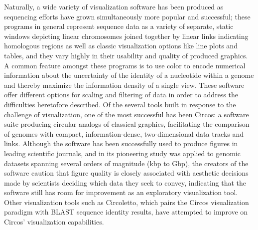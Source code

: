 \documentclass[twocolumn]{article}
\begin{document}
Naturally, a wide variety of visualization software has been produced as sequencing efforts have grown simultaneously more popular and successful; these programs in general represent sequence data as a variety of separate, static windows depicting linear chromosomes joined together by linear links indicating homologous regions as well as classic visualization options like line plots and tables, and they vary highly in their usability and quality of produced graphics. A common feature amongst these programs is to use color to encode numerical information about the uncertainty of the identity of a nucleotide within a genome and thereby maximize the information density of a single view. These software offer different options for scaling and filtering of data in order to address the difficulties heretofore described.\cite{challenge} Of the several tools built in response to the challenge of visualization, one of the most successful has been Circos: a software suite producing circular analogs of classical graphics, facilitating the comparison of genomes with compact, information-dense, two-dimensional data tracks and links. %
Although the software has been successfully used to produce figures in leading scientific journals, and in its pioneering study was applied to genomic datasets spanning several orders of magnitude (kbp to Gbp), the creators of the software caution that figure quality is closely associated with aesthetic decisions made by scientists deciding which data they seek to convey, indicating that the software still has room for improvement as an exploratory visualization tool. Other visualization tools such as Circoletto, which pairs the Circos visualization paradigm with BLAST sequence identity results, have attempted to improve on Circos' visualization capabilities.\cite{circoletto} %
\end{document}
